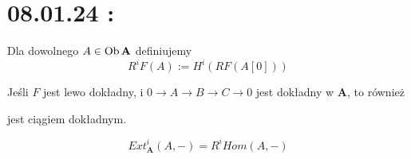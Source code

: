 \section{08.01.24 : }

\begin{center}\end{center}

\begin{definition}
  Dla dowolnego $A\in\operatorname{Ob}\mathbf{A}$ definiujemy
  $$R^iF(A):=H^i(RF(A[0]))$$
\end{definition}

\begin{fact}
  Jeśli $F$ jest lewo dokładny, i $0\to A\to B\to C\to 0$ jest dokładny w $\mathbf{A}$, to również
  \begin{center}\end{center}
    jest ciągiem dokładnym.
\end{fact}

\begin{fact}
  $$Ext_\mathbf{A}^i(A,-)=R^iHom(A, -)$$
\end{fact}


